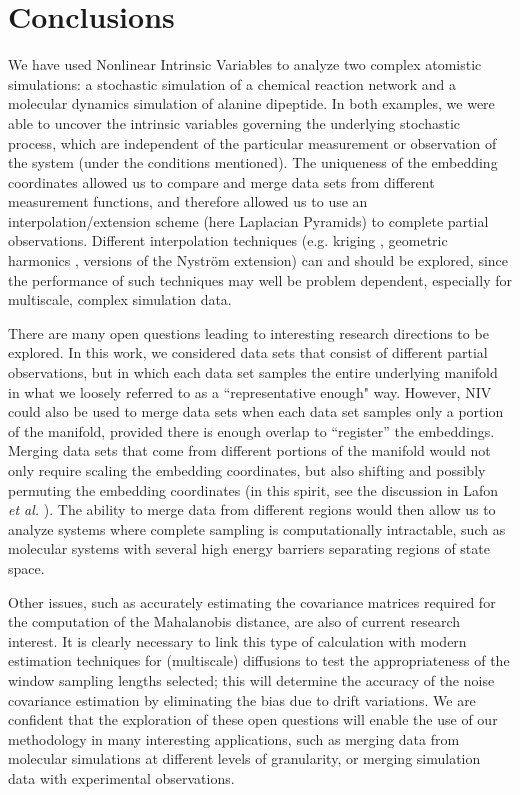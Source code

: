\section{Conclusions} \label{sec:conclusions}
%
We have used Nonlinear Intrinsic Variables to analyze two complex atomistic simulations: a stochastic simulation of a chemical reaction network and a molecular dynamics simulation of alanine dipeptide.
%
In both examples, we were able to uncover the intrinsic variables governing the underlying stochastic process, which are independent
of the particular measurement or observation  of the system (under the conditions mentioned).
%
The uniqueness of the embedding coordinates allowed us to compare and merge data sets from different measurement functions,
and therefore allowed us to use an interpolation/extension scheme (here Laplacian Pyramids) to complete partial observations.
%
Different interpolation techniques (e.g. kriging \cite{matheron1963principles, matheron1973intrinsic}, geometric harmonics \cite{coifman2006geometric},  versions of the Nystr\"{o}m extension) can and should
be explored, since the performance of such techniques may well be problem dependent, especially for multiscale, complex simulation data.

There are many open questions leading to interesting research directions to be explored.
%
In this work, we considered data sets that consist of different partial observations, but in which each data set samples the entire underlying manifold in
what we loosely referred to as a ``representative enough" way.
%
However, NIV could also be used to merge data sets when each data set samples only a portion of the manifold, provided there is enough overlap to ``register'' the embeddings.
%
Merging data sets that come from different portions of the manifold would not only require scaling the embedding coordinates,
but also shifting and possibly permuting the embedding coordinates (in this spirit, see the discussion in Lafon {\em et al.} \cite{lafon2006data}).
%
The ability to merge data from different regions would then allow us to analyze systems where complete sampling is computationally intractable,
such as molecular systems with several high energy barriers separating regions of state space.

Other issues, such as accurately estimating the covariance matrices required for the computation of the Mahalanobis distance, are also of current research interest.
%
It is clearly necessary to link this type of calculation with modern estimation techniques for (multiscale) diffusions \cite{ait2002maximum, ait2003effects, ait2008closed}
to test the appropriateness of the window sampling lengths selected; this will determine the accuracy of the noise covariance estimation by eliminating
the bias due to drift variations.
%
We are confident that the exploration of these open questions will enable the use of our methodology in many  interesting applications,
such as merging data from molecular simulations at different levels of granularity, or merging simulation data with experimental observations.



